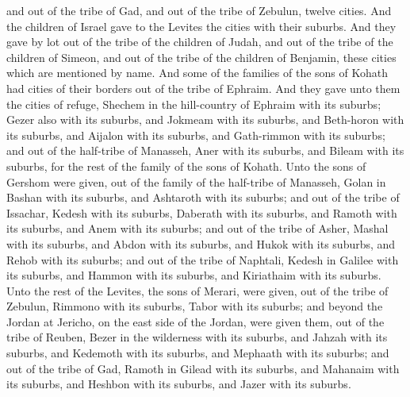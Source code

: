 and out of the tribe of Gad, and out of the tribe of Zebulun, twelve cities. And the children of Israel gave to the Levites the cities with their suburbs. And they gave by lot out of the tribe of the children of Judah, and out of the tribe of the children of Simeon, and out of the tribe of the children of Benjamin, these cities which are mentioned by name.  And some of the families of the sons of Kohath had cities of their borders out of the tribe of Ephraim. And they gave unto them the cities of refuge, Shechem in the hill-country of Ephraim with its suburbs; Gezer also with its suburbs, and Jokmeam with its suburbs, and Beth-horon with its suburbs, and Aijalon with its suburbs, and Gath-rimmon with its suburbs; and out of the half-tribe of Manasseh, Aner with its suburbs, and Bileam with its suburbs, for the rest of the family of the sons of Kohath.  Unto the sons of Gershom were given, out of the family of the half-tribe of Manasseh, Golan in Bashan with its suburbs, and Ashtaroth with its suburbs; and out of the tribe of Issachar, Kedesh with its suburbs, Daberath with its suburbs, and Ramoth with its suburbs, and Anem with its suburbs; and out of the tribe of Asher, Mashal with its suburbs, and Abdon with its suburbs, and Hukok with its suburbs, and Rehob with its suburbs; and out of the tribe of Naphtali, Kedesh in Galilee with its suburbs, and Hammon with its suburbs, and Kiriathaim with its suburbs.  Unto the rest of the Levites, the sons of Merari, were given, out of the tribe of Zebulun, Rimmono with its suburbs, Tabor with its suburbs; and beyond the Jordan at Jericho, on the east side of the Jordan, were given them, out of the tribe of Reuben, Bezer in the wilderness with its suburbs, and Jahzah with its suburbs, and Kedemoth with its suburbs, and Mephaath with its suburbs; and out of the tribe of Gad, Ramoth in Gilead with its suburbs, and Mahanaim with its suburbs, and Heshbon with its suburbs, and Jazer with its suburbs. 

